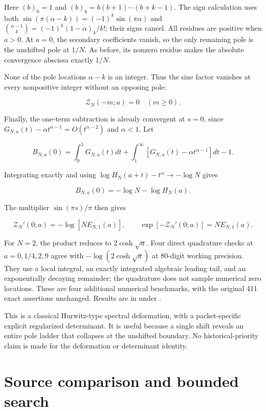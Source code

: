Here \((b)_0=1\) and \((b)_k=b(b+1)\cdots(b+k-1)\). The sign calculation
uses both \(\sin(\pi(\alpha-k))=(-1)^k\sin(\pi\alpha)\) and
\(\binom{\alpha-1}{k}=(-1)^k(1-\alpha)_k/k!\); their signs cancel. All
residues are positive when \(a>0\). At \(a=0\), the secondary
coefficients vanish, so the only remaining pole is the unshifted pole at
\(1/N\). As before, its nonzero residue makes the absolute convergence
abscissa exactly \(1/N\).

None of the pole locations \(\alpha-k\) is an integer. Thus the sine
factor vanishes at every nonpositive integer without an opposing pole:

\[
\boxed{\mathcal Z_N(-m;a)=0\quad(m\ge0).}
\tag{T8}
\]

Finally, the one-term subtraction is already convergent at \(s=0\),
since \(G_{N,a}(t)-\alpha t^{\alpha-1}=O(t^{\alpha-2})\) and
\(\alpha<1\). Let

\[
B_{N,a}(0)=\int_0^1G_{N,a}(t)dt
 +\int_1^\infty[G_{N,a}(t)-\alpha t^{\alpha-1}]dt-1.
\]

Integrating exactly and using \(\log H_N(a+t)-t^\alpha\to-\log N\) gives

\[
B_{N,a}(0)=-\log N-\log H_N(a).
\]

The multiplier \(\sin(\pi s)/\pi\) then gives

\[
\boxed{\mathcal Z_N'(0;a)=-\log[N E_{N,1}(a)],\qquad
       \exp[-\mathcal Z_N'(0;a)]=N E_{N,1}(a).}
\tag{T9}
\]

For \(N=2\), the product reduces to \(2\cosh\sqrt a\). Four direct
quadrature checks at \(a=0,1/4,2,9\) agree with \(-\log(2\cosh\sqrt a)\)
at 80-digit working precision. They use a local integral, an exactly
integrated algebraic leading tail, and an exponentially decaying
remainder; the quadrature does not sample numerical zero locations.
These are four additional numerical benchmarks, with the original 411
exact assertions unchanged. Results are in
 under
.

This is a classical Hurwitz-type spectral deformation, with a
packet-specific explicit regularized determinant. It is useful because a
single shift reveals an entire pole ladder that collapses at the
unshifted boundary. No historical-priority claim is made for the
deformation or determinant identity.

\hypertarget{source-comparison-and-bounded-search}{%
\section{Source comparison and bounded
search}\label{source-comparison-and-bounded-search}}

